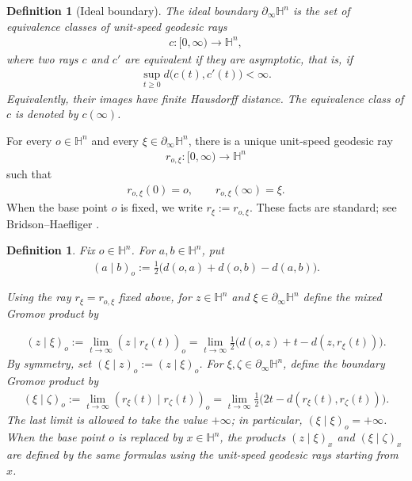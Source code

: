 \documentclass[11pt]{amsart}
\theoremstyle{plain}
\theoremstyle{plain}
\newtheorem{definition}[theorem]{Definition}
\theoremstyle{plain}
\newcommand{\Hn}{\mathbb H^n}
\newcommand{\bdry}{\partial_\infty}
\numberwithin{equation}{section}
\begin{document}

\begin{definition}[Ideal boundary]\label{def:ideal-boundary}
The ideal boundary \(\bdry\Hn\) is the set of equivalence classes of
unit-speed geodesic rays
\begin{align}
c:[0,\infty)\longrightarrow\Hn,
\nonumber
\end{align}
where two rays \(c\) and \(c'\) are equivalent if they are asymptotic,
that is, if
\begin{align}
\sup_{t\geq0}d\bigl(c(t),c'(t)\bigr)<\infty.
\nonumber
\end{align}
Equivalently, their images have finite Hausdorff distance.  The
equivalence class of \(c\) is denoted by \(c(\infty)\).
\end{definition}

For every \(o\in\Hn\) and every \(\xi\in\bdry\Hn\), there is a unique
unit-speed geodesic ray
\begin{align}
r_{o,\xi}:[0,\infty)\longrightarrow\Hn
\nonumber
\end{align}
such that
\begin{align}
r_{o,\xi}(0)=o,
\qquad
r_{o,\xi}(\infty)=\xi.
\nonumber
\end{align}
When the base point \(o\) is fixed, we write \(r_\xi:=r_{o,\xi}\).
These facts are standard; see Bridson--Haefliger
\cite[Definition~II.8.1 and Proposition~II.8.2]{BridsonHaefliger}.

\begin{definition}\label{def:Gromov-product}
Fix \(o\in\Hn\).  For \(a,b\in\Hn\), put
\begin{align}
(a\mid b)_o
:=
\frac12\bigl(d(o,a)+d(o,b)-d(a,b)\bigr).\nonumber
\end{align}

Using the ray \(r_\xi=r_{o,\xi}\) fixed above, for \(z\in\Hn\) and
\(\xi\in\bdry\Hn\) define the mixed Gromov product by

\begin{align}
(z\mid\xi)_o:=\lim_{t\to\infty}(z\mid r_\xi(t))_o=\lim_{t\to\infty}\frac12\bigl(d(o,z)+t-d(z,r_\xi(t))\bigr).
\label{eq:mixed-Gromov-product-definition}
\end{align}
By symmetry, set $(\xi\mid z)_o:=(z\mid\xi)_o$.  For \(\xi,\zeta\in\bdry\Hn\), define the boundary Gromov product by
\begin{align}
(\xi\mid\zeta)_o:=\lim_{t\to\infty}(r_\xi(t)\mid r_\zeta(t))_o=\lim_{t\to\infty}\frac12\bigl(2t-d(r_\xi(t),r_\zeta(t))\bigr). \label{eq:boundary-Gromov-product-definition}
\end{align}
The last limit is allowed to take the value \(+\infty\); in particular,
\((\xi\mid\xi)_o=+\infty\).  When the base point \(o\) is replaced by
\(x\in\Hn\), the products \((z\mid\xi)_x\) and
\((\xi\mid\zeta)_x\) are defined by the same formulas using the
unit-speed geodesic rays starting from \(x\).
\end{definition}
\end{document}
